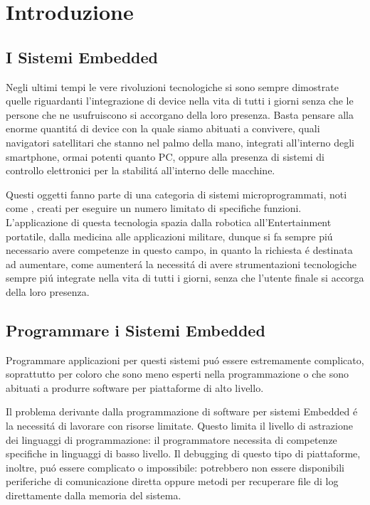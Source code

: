 \chapter{Introduzione}
\label{chap:Intro}

\section{I Sistemi Embedded}

Negli ultimi tempi le vere rivoluzioni tecnologiche si sono sempre
dimostrate quelle riguardanti l'integrazione di device nella vita di tutti
i giorni senza che le persone che ne usufruiscono si accorgano della loro
presenza. Basta pensare alla enorme quantit\'a di device con la quale
siamo abituati a convivere, quali navigatori satellitari che stanno nel
palmo della mano, integrati all'interno degli smartphone, ormai
potenti quanto PC, oppure alla presenza di sistemi di controllo
elettronici per la stabilit\'a all'interno delle macchine.

Questi oggetti fanno parte di una categoria di sistemi
microprogrammati, noti come , creati per eseguire
un numero limitato di specifiche funzioni. L'applicazione di questa
tecnologia spazia dalla robotica all'Entertainment portatile, dalla
medicina alle applicazioni militare, dunque si fa sempre pi\'u
necessario avere competenze
in questo campo, in quanto la richiesta \'e destinata ad aumentare,
come aumenter\'a la necessit\'a di avere strumentazioni tecnologiche sempre
pi\'u integrate nella vita di tutti i giorni, senza che l'utente finale si
accorga della loro presenza.

\section{Programmare i Sistemi Embedded}

Programmare applicazioni per questi sistemi pu\'o essere
estremamente complicato, soprattutto per coloro che sono meno esperti nella
programmazione o che sono abituati a produrre software per piattaforme di
alto livello.

 Il problema derivante dalla programmazione di software per
sistemi Embedded \'e la necessit\'a di lavorare con risorse limitate.
Questo limita il livello di astrazione dei linguaggi di programmazione:
il programmatore necessita di competenze specifiche in linguaggi di basso
livello.
Il debugging di questo tipo di piattaforme, inoltre, pu\'o essere
complicato o impossibile: potrebbero non essere disponibili
periferiche di comunicazione diretta oppure metodi per
recuperare file di log direttamente dalla memoria del sistema.

